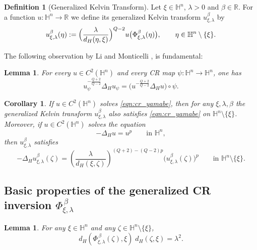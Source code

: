 \documentclass[reqno]{amsart}
\newtheorem{cor}[thm]{Corollary}
\newtheorem{lem}[thm]{Lemma}
\theoremstyle{definition}
\newtheorem{defn}[thm]{Definition}
\theoremstyle{remark}
\numberwithin{equation}{section}
\begin{document}
\begin{defn}[Generalized Kelvin Transform]
Let $\xi\in\mathbb{H}^n$, $\lambda>0$ and $\beta\in\mathbb{R}$. For a function $u:\mathbb{H}^n\to\mathbb{R}$ 
we define its generalized Kelvin transform $u_{\xi,\lambda}^{\beta}$ by
\[
u_{\xi,\lambda}^{\beta}(\eta):=\Bigl(\frac{\lambda}{d_H(\eta,\xi)}\Bigr)^{Q-2}
u \bigl(\Phi_{\xi,\lambda}^{\beta}(\eta)\bigr),\qquad \eta\in\mathbb{H}^n\setminus\{\xi\}.
\]
\end{defn}


The following observation by Li and Monticelli \cite[Remark 2.9]{LM12}, is fundamental:

\begin{lem}\label{lem:Li-Monticelli}
For every $u\in C^2(\mathbb{H}^n)$ and every CR map $\psi:\mathbb{H}^n\rightarrow\mathbb{H}^n$,
one has
\begin{equation}
u_\psi^{-\frac{Q+2}{Q-2}}\Delta_{\! H}u_\psi=\big(u^{-\frac{Q+2}{Q-2}}\Delta_{\! H}u\big)\circ\psi.
\end{equation}
\end{lem}




\begin{cor}\label{cor:conformal_invariance}
If $u\in C^2(\mathbb{H}^n)$ solves \eqref{eqn:cr_yamabe}, then for any $\xi,\lambda,\beta$ the 
generalized Kelvin transform $u_{\xi,\lambda}^{\beta}$ also satisfies \eqref{eqn:cr_yamabe} 
on $\mathbb{H}^n\setminus\{\xi\}$. Moreover, 
if $u\in C^2(\mathbb{H}^n)$ solves
the equation
\[
-\Delta_{\! H} u = u^p \qquad \text{in } \mathbb{H}^n,
\]
then $u_{\xi,\lambda}^{\beta}$ satisfies
\[
-\Delta_{\! H} u_{\xi,\lambda}^{\beta} (\zeta) = \left( \frac{\lambda}{ d_{\! H} (\xi, \zeta) } \right)^{(Q+2) - (Q-2)p} 
\bigl(u_{\xi,\lambda}^{\beta} (\zeta)\bigr)^p \qquad \text{in } \mathbb{H}^n\setminus \{\xi\}.
\]
\end{cor}




\subsection{Basic properties of the generalized CR inversion $\Phi_{\xi, \lambda}^{\, \beta}$}
\label{subsec:Basicproperties}

\begin{lem}\label{lem:gndCRinv1}
For any $\xi\in \mathbb{H}^n$ and any $\zeta \in \mathbb{H}^n\setminus \{\xi\}$,
\begin{equation}\label{eqn:reflectionidentity}
d_{\! H}\! \left(\Phi_{\xi, \lambda}^{\, \beta} (\zeta), \xi\right) \; d_{\! H}\! (\zeta, \xi)=\lambda^{2}.
\end{equation}
\end{lem}
\end{document}
